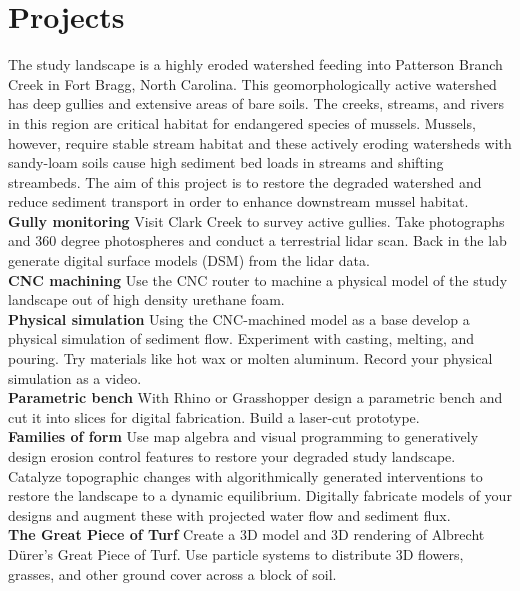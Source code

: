 \documentclass[11pt,article,oneside]{memoir}
\begin{document}
\section{Projects}
The study landscape is a highly eroded watershed
feeding into Patterson Branch Creek in Fort Bragg, North Carolina.
This geomorphologically active watershed has deep gullies and
extensive areas of bare soils.
The creeks, streams, and rivers in this region are critical habitat
for endangered species of mussels.
Mussels, however, require stable stream habitat
and these actively eroding watersheds with sandy-loam soils
cause high sediment bed loads in streams and shifting streambeds.
The aim of this project is to restore the degraded watershed
and reduce sediment transport  
in order to enhance downstream mussel habitat.\\

\noindent \textbf{Gully monitoring}
Visit Clark Creek to survey active gullies.
Take photographs and 360 degree photospheres and
conduct a terrestrial lidar scan.
Back in the lab generate digital surface models (DSM)
from the lidar data.\\

\noindent \textbf{CNC machining}
Use the CNC router to machine a physical model
of the study landscape out of high density urethane foam.\\

\noindent \textbf{Physical simulation}
Using the CNC-machined model as a base
develop a physical simulation of sediment flow.
Experiment with casting, melting, and pouring. 
Try materials like hot wax or molten aluminum. 
Record your physical simulation as a video.\\

\noindent \textbf{Parametric bench}
With Rhino or Grasshopper
design a parametric bench and cut it into slices
for digital fabrication.
Build a laser-cut prototype.\\

\noindent \textbf{Families of form}
Use map algebra and visual programming to generatively design
erosion control features to restore your degraded study landscape.
Catalyze topographic changes 
with algorithmically generated interventions
to restore the landscape to a dynamic equilibrium.  
Digitally fabricate models of your designs
and augment these with projected water flow and sediment flux.\\

\noindent \textbf{The Great Piece of Turf}
Create a 3D model and 3D rendering of
Albrecht Dürer's Great Piece of Turf.
Use particle systems to distribute 3D flowers, grasses,
and other ground cover across a block of soil.\\
\end{document}
